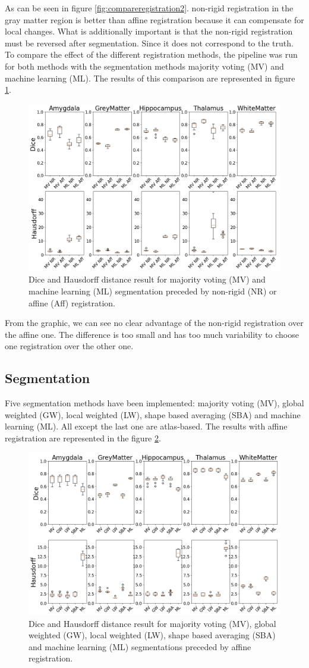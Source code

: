 As can be seen in figure \ref{fig:compareregistration2}. non-rigid registration in the gray matter region is better than affine registration because it can compensate for local changes. What is additionally important is that the non-rigid registration must be reversed after segmentation. Since it does not correspond to the truth.
To compare the effect of the different registration methods, the pipeline was run for both methods with the segmentation methods majority voting (MV) and machine learning (ML). The results of this comparison are represented in figure \ref{fig:boxplotReg}.

\begin{figure}[h!]
	\centering
	\includegraphics[width = .48 \textwidth]{img/boxplotComparisonNRAff2}
	\caption{Dice and Hausdorff distance result for majority voting (MV) and machine learning (ML) segmentation preceded by non-rigid (NR) or affine (Aff) registration.}
	\label{fig:boxplotReg}
\end{figure}

From the graphic, we can see no clear advantage of the non-rigid registration over the affine one. The difference is too small and has too much variability to choose one registration over the other one.

\subsection*{Segmentation}
Five segmentation methods have been implemented: majority voting (MV), global weighted (GW), local weighted (LW), shape based averaging (SBA) and machine learning (ML). All except the last one are atlas-based. The results with affine registration are represented in the figure \ref{fig:boxplotAff}.

\begin{figure}[h!]
	\centering
	\includegraphics[width = .48 \textwidth]{img/boxplot_Affine_all2}
	\caption{Dice and Hausdorff distance result for majority voting (MV), global weighted (GW), local weighted (LW), shape based averaging (SBA) and machine learning (ML) segmentations preceded by affine registration.}
	\label{fig:boxplotAff}
\end{figure}

